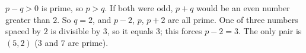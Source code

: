 $p-q>0$ is prime, so $p>q$. If both were odd, $p+q$ would be an even number greater than $2$. So $q=2$, and $p-2$, $p$, $p+2$ are all prime. One of three numbers spaced by $2$ is divisible by $3$, so it equals $3$; this forces $p-2=3$. The only pair is $\boxed{(5,2)}$ ($3$ and $7$ are prime).
